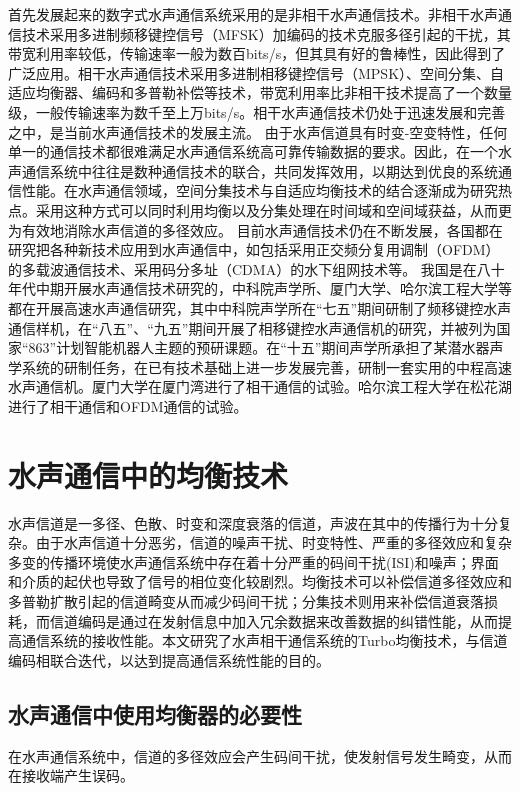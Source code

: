 首先发展起来的数字式水声通信系统采用的是非相干水声通信技术。非相干水声通信技术采用多进制频移键控信号（MFSK）加编码的技术克服多径引起的干扰，其带宽利用率较低，传输速率一般为数百bits/s，但其具有好的鲁棒性，因此得到了广泛应用。相干水声通信技术采用多进制相移键控信号（MPSK）、空间分集、自适应均衡器、编码和多普勒补偿等技术，带宽利用率比非相干技术提高了一个数量级，一般传输速率为数千至上万bits/s。相干水声通信技术仍处于迅速发展和完善之中，是当前水声通信技术的发展主流。
由于水声信道具有时变-空变特性，任何单一的通信技术都很难满足水声通信系统高可靠传输数据的要求。因此，在一个水声通信系统中往往是数种通信技术的联合，共同发挥效用，以期达到优良的系统通信性能。在水声通信领域，空间分集技术与自适应均衡技术的结合逐渐成为研究热点。采用这种方式可以同时利用均衡以及分集处理在时间域和空间域获益，从而更为有效地消除水声信道的多径效应。
目前水声通信技术仍在不断发展，各国都在研究把各种新技术应用到水声通信中，如包括采用正交频分复用调制（OFDM）的多载波通信技术、采用码分多址（CDMA）的水下组网技术等\cite{Sozer2000,Rice2000,zhuweiqing1998}。
我国是在八十年代中期开展水声通信技术研究的，中科院声学所、厦门大学、哈尔滨工程大学等都在开展高速水声通信研究，其中中科院声学所在“七五”期间研制了频移键控水声通信样机，在“八五”、“九五”期间开展了相移键控水声通信机的研究\cite{zhuweiqing1998}，并被列为国家“863”计划智能机器人主题的预研课题。在“十五”期间声学所承担了某潜水器声学系统的研制任务，在已有技术基础上进一步发展完善，研制一套实用的中程高速水声通信机。厦门大学在厦门湾进行了相干通信的试验\cite{TXU1997}。哈尔滨工程大学在松花湖进行了相干通信和OFDM通信的试验。
\section{水声通信中的均衡技术}
水声信道是一多径、色散、时变和深度衰落的信道，声波在其中的传播行为十分复杂。由于水声信道十分恶劣，信道的噪声干扰、时变特性、严重的多径效应和复杂多变的传播环境使水声通信系统中存在着十分严重的码间干扰(ISI)和噪声；界面和介质的起伏也导致了信号的相位变化较剧烈。均衡技术可以补偿信道多径效应和多普勒扩散引起的信道畸变从而减少码间干扰；分集技术则用来补偿信道衰落损耗，而信道编码是通过在发射信息中加入冗余数据来改善数据的纠错性能，从而提高通信系统的接收性能。本文研究了水声相干通信系统的Turbo均衡技术，与信道编码相联合迭代，以达到提高通信系统性能的目的。
\subsection{水声通信中使用均衡器的必要性}
在水声通信系统中，信道的多径效应会产生码间干扰，使发射信号发生畸变，从而在接收端产生误码。

